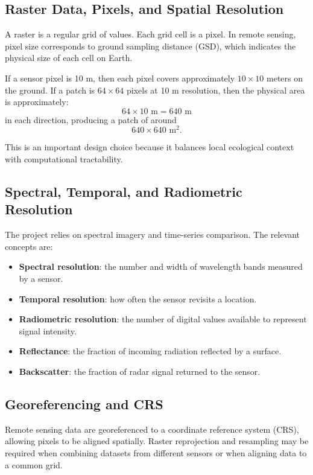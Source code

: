 \documentclass[11pt]{article}
\begin{document}
\subsection{Raster Data, Pixels, and Spatial Resolution}
A raster is a regular grid of values. Each grid cell is a pixel. In remote sensing, pixel size corresponds to ground sampling distance (GSD), which indicates the physical size of each cell on Earth.

If a sensor pixel is 10 m, then each pixel covers approximately $10 \times 10$ meters on the ground. If a patch is $64 \times 64$ pixels at 10 m resolution, then the physical area is approximately:
\[
64 \times 10\text{ m} = 640\text{ m}
\]
in each direction, producing a patch of around
\[
640 \times 640\text{ m}^2.
\]

This is an important design choice because it balances local ecological context with computational tractability.

\subsection{Spectral, Temporal, and Radiometric Resolution}
The project relies on spectral imagery and time-series comparison. The relevant concepts are:
\begin{itemize}
    \item \textbf{Spectral resolution}: the number and width of wavelength bands measured by a sensor.
    \item \textbf{Temporal resolution}: how often the sensor revisits a location.
    \item \textbf{Radiometric resolution}: the number of digital values available to represent signal intensity.
    \item \textbf{Reflectance}: the fraction of incoming radiation reflected by a surface.
    \item \textbf{Backscatter}: the fraction of radar signal returned to the sensor.
\end{itemize}

\subsection{Georeferencing and CRS}
Remote sensing data are georeferenced to a coordinate reference system (CRS), allowing pixels to be aligned spatially. Raster reprojection and resampling may be required when combining datasets from different sensors or when aligning data to a common grid.
\end{document}
